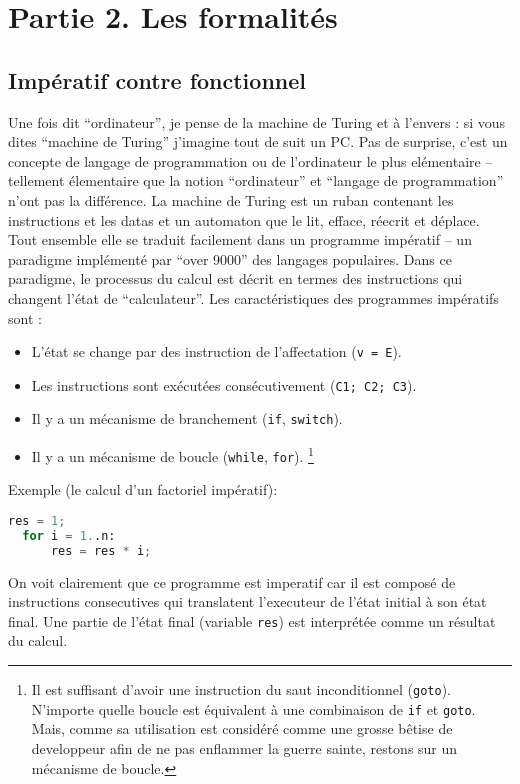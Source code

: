 \section*{Partie 2. Les formalités}

\subsection*{Impératif contre fonctionnel}
Une fois dit ``ordinateur'', je pense de la machine de Turing et à l'envers : si vous dites ``machine de Turing'' j'imagine tout de suit un PC.
Pas de surprise, c'est un concepte de langage de programmation ou de l'ordinateur le plus elémentaire -- tellement élementaire que la notion ``ordinateur'' et ``langage de programmation'' n'ont pas la différence.
La machine de Turing est un ruban contenant les instructions et les datas et un automaton que le lit, efface, réecrit et déplace.
Tout ensemble elle se traduit facilement dans un programme impératif -- un paradigme implémenté par ``over 9000'' des langages populaires.
Dans ce paradigme, le processus du calcul est décrit en termes des instructions qui changent l'état de ``calculateur''.
Les caractéristiques des programmes impératifs sont :
\begin{itemize}
	\item L'état se change par des instruction de l'affectation (\verb|v = E|).
	\item Les instructions sont exécutées consécutivement (\verb|C1; C2; C3|).
	\item Il y a un mécanisme de branchement (\verb|if|, \verb|switch|).
	\item Il y a un mécanisme de boucle (\verb|while|, \verb|for|).
	\footnote{Il est suffisant d'avoir une instruction du saut inconditionnel (\verb|goto|). N'importe quelle boucle est équivalent à une combinaison de \verb|if| et \verb|goto|. Mais, comme sa utilisation est considéré comme une grosse bêtise de developpeur afin de ne pas enflammer la guerre sainte, restons sur un mécanisme de boucle.}
\end{itemize}
Exemple (le calcul d'un factoriel impératif):
\begin{lstlisting}[language=Python]
  res = 1;
  for i = 1..n:
      res = res * i;
\end{lstlisting}
On voit clairement que ce programme est imperatif car il est composé de instructions consecutives qui translatent l'executeur de l'état initial à son état final.
Une partie de l'état final (variable \verb|res|) est interprétée comme un résultat du calcul.

